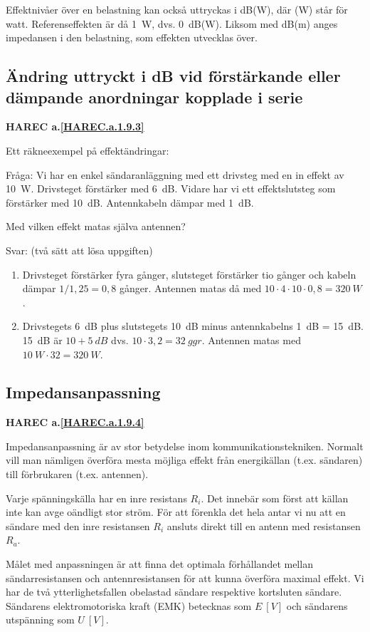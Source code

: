 Effektnivåer över en belastning kan också uttryckas i dB(W), där (W)
står för watt. Referenseffekten är då 1~W, dvs. 0~dB(W).
Liksom med dB(m) anges impedansen i den belastning, som effekten utvecklas över.

\subsection{Ändring uttryckt i dB vid förstärkande eller dämpande anordningar kopplade i serie}
\textbf{HAREC a.\ref{HAREC.a.1.9.3}\label{myHAREC.a.1.9.3}}

Ett räkneexempel på effektändringar:

Fråga: Vi har en enkel sändaranläggning med ett drivsteg med en in effekt av 10~W.
Drivsteget förstärker med 6~dB. Vidare har vi ett effektslutsteg som förstärker
med 10~dB. Antennkabeln dämpar med 1~dB.

Med vilken effekt matas själva antennen?

Svar: (två sätt att lösa uppgiften)

\begin{enumerate}
\item Drivsteget förstärker fyra gånger, slutsteget förstärker tio gånger och
kabeln dämpar \(1/1,25 = 0,8\) gånger. Antennen matas då med
\(10 \cdot 4 \cdot 10 \cdot 0,8 = 320\ W\).
\item Drivstegets 6~dB plus slutstegets 10~dB minus antennkabelns 1~dB = 15~dB.
15~dB är \(10 + 5\ dB\) dvs. \(10 \cdot 3,2 = 32\ ggr\). Antennen matas med
\(10\ W \cdot 32 = 320\ W\).
\end{enumerate}

\subsection{Impedansanpassning}
\textbf{HAREC a.\ref{HAREC.a.1.9.4}\label{myHAREC.a.1.9.4}}

Impedansanpassning är av stor betydelse inom kommunikationstekniken.
Normalt vill man nämligen överföra mesta möjliga effekt från energikällan
(t.ex. sändaren) till förbrukaren (t.ex. antennen).

Varje spänningskälla har en inre resistans \(R_i\). Det innebär som först att
källan inte kan avge oändligt stor ström.
För att förenkla det hela antar vi nu att en sändare med den inre resistansen
\(R_i\) ansluts direkt till en antenn med resistansen \(R_a\).

Målet med anpassningen är att finna det optimala förhållandet mellan
sändarresistansen och antennresistansen för att kunna överföra maximal effekt.
Vi har de två ytterlighetsfallen obelastad sändare respektive kortsluten
sändare. Sändarens elektromotoriska kraft (EMK) betecknas som \(E\ [V]\) och
sändarens utspänning som \(U\ [V]\).

